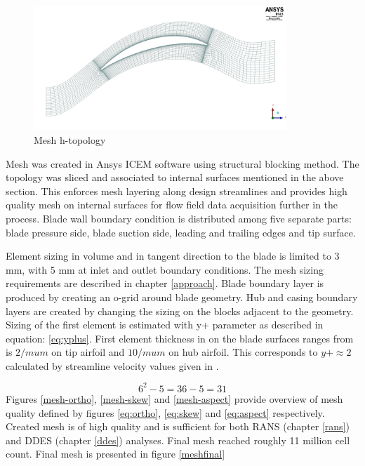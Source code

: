 \begin{figure}[h!]
\centering %
\includegraphics[width=0.85\textwidth]{Pictures/r67_htopo.jpg}
\caption{Mesh h-topology}
\label{h_topo}
\end{figure}

Mesh was created in Ansys ICEM software using structural blocking method. The topology was sliced and associated to internal surfaces mentioned in the above section. This enforces mesh layering along design streamlines and provides high quality mesh on internal surfaces for flow field data acquisition further in the process. Blade wall boundary condition is distributed among five separate parts: blade pressure side, blade suction side, leading and trailing edges and tip surface. 

Element sizing in volume and in tangent direction to the blade is limited to 3 mm, with 5 mm at inlet and outlet boundary conditions. The mesh sizing requirements are described in chapter \ref{approach}.  Blade boundary layer is produced by creating an o-grid around blade geometry. Hub and casing boundary layers are created by changing the sizing on the blocks adjacent to the geometry. Sizing of the first element is estimated with y+ parameter as described in equation: \ref{eq:yplus}. First element thickness in on the blade surfaces ranges from is $2 /mu m$ on tip airfoil and $10 /mu m$ on hub airfoil. This corresponds to $y+ \approx 2$ calculated by streamline velocity values given in \citep{r67laser}.

\begin{equation} \label{eq:yplus}
6^2 - 5 = 36-5 = 31
\end{equation}
Figures \ref{mesh-ortho}, \ref{mesh-skew} and \ref{mesh-aspect} provide overview of mesh quality defined by figures \ref{eq:ortho}, \ref{eq:skew} and \ref{eq:aspect} respectively. Created mesh is of high quality and is sufficient for both RANS (chapter \ref{rans}) and DDES (chapter \ref{ddes}) analyses. Final mesh reached roughly 11 million cell count. Final mesh is presented in figure \ref{meshfinal} 


